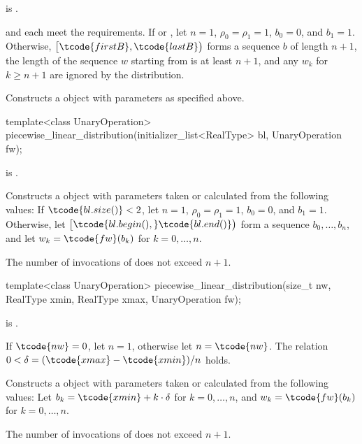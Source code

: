 \begin{itemdescr}
\pnum
\mandates
{} is .

\pnum
\expects
   and 
   each meet the
   requirements.
 If 
 or ,
 let $n = 1$,
     $\rho_0 = \rho_1 = 1$,
     $b_0 = 0$,
 and $b_1 = 1$.
 Otherwise,
 $\bigl[\tcode{firstB}, \tcode{lastB}\bigr)$
 forms a sequence $b$ of length $n+1$,
 the length of the sequence $w$ starting from 
 is at least $n+1$,
 and any $w_k$ for $k \geq n + 1$ are ignored by the distribution.

\pnum
\effects
Constructs a  object
 with parameters as specified above.
\end{itemdescr}


%
\begin{itemdecl}
template<class UnaryOperation>
 piecewise_linear_distribution(initializer_list<RealType> bl, UnaryOperation fw);
\end{itemdecl}

\begin{itemdescr}
\pnum
\mandates
{} is .

\pnum
\effects
Constructs a  object
 with parameters taken or calculated
 from the following values:
 If $\tcode{bl.size()} < 2$,
 let $n = 1$,
     $\rho_0 = \rho_1 = 1$,
     $b_0 = 0$,
 and $b_1 = 1$.
 Otherwise,
 let $\bigl[\tcode{bl.begin(),} \tcode{bl.end()}\bigr)$
 form a sequence $b_0, \dotsc, b_n$,
 and
 let $w_k = \tcode{fw}(b_k)$
 for $k = 0, \dotsc, n$.

\pnum
\complexity
The number of invocations of  does not exceed $n+1$.
\end{itemdescr}


%
\begin{itemdecl}
template<class UnaryOperation>
 piecewise_linear_distribution(size_t nw, RealType xmin, RealType xmax, UnaryOperation fw);
\end{itemdecl}

\begin{itemdescr}
\pnum
\mandates
{} is .

\pnum
\expects
 If $\tcode{nw} = 0$, let $n = 1$, otherwise let $n = \tcode{nw}$.
 The relation $0 < \delta = (\tcode{xmax} - \tcode{xmin}) / n$
 holds.

\pnum
\effects
Constructs a  object
 with parameters taken or calculated
 from the following values:
 Let $b_k = \tcode{xmin} + k \cdot \delta$ for $k = 0, \dotsc, n$,
 and $w_k = \tcode{fw}(b_k)$ for $k = 0, \dotsc, n$.

\pnum
\complexity
The number of invocations of  does not exceed $n+1$.
\end{itemdescr}

